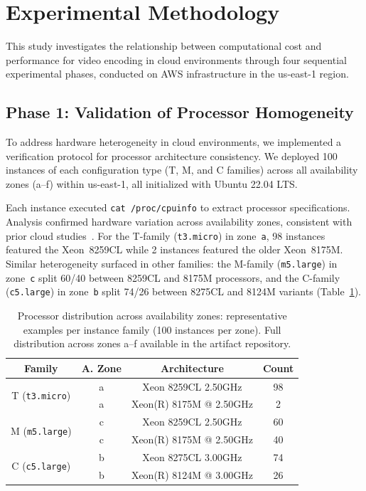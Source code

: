 \documentclass[conference]{IEEEtran}
\begin{document}
\section{Experimental Methodology}
\label{met}

This study investigates the relationship between computational cost and
performance for video encoding in cloud environments through four sequential
experimental phases, conducted on AWS infrastructure in the us-east-1 region.

\subsection{Phase 1: Validation of Processor Homogeneity}

To address hardware heterogeneity in cloud environments, we implemented a
verification protocol for processor architecture consistency. We deployed 100
instances of each configuration type (T, M, and C families) across all
availability zones (a--f) within us-east-1, all initialized with Ubuntu 22.04
LTS.

Each instance executed \texttt{cat /proc/cpuinfo} to extract processor
specifications. Analysis confirmed hardware variation across availability
zones, consistent with prior cloud studies~\cite{b2, b5, b6, b7}. For the
T-family (\texttt{t3.micro}) in zone~\texttt{a}, 98 instances featured the
Xeon~8259CL while 2 instances featured the older Xeon~8175M. Similar
heterogeneity surfaced in other families: the M-family (\texttt{m5.large}) in
zone~\texttt{c} split 60/40 between 8259CL and 8175M processors, and the
C-family (\texttt{c5.large}) in zone~\texttt{b} split 74/26 between 8275CL
and 8124M variants (Table~\ref{tab:processors}).

\begin{table}[H]
	\centering
	\caption{Processor distribution across availability zones: representative
	examples per instance family (100 instances per zone). Full distribution
	across zones a--f available in the artifact repository.}
	\small
	\label{tab:processors}
	\begin{tabular}{|c|c|c|c|}
		\hline
		\textbf{Family} & \textbf{A. Zone} & \textbf{Architecture} & \textbf{Count} \\ \hline
		\multirow{2}{*}{T (\texttt{t3.micro})} & a & Xeon 8259CL 2.50GHz & 98 \\ \cline{2-4}
		& a & Xeon(R) 8175M @ 2.50GHz & 2 \\ \hline
		\multirow{2}{*}{M (\texttt{m5.large})} & c & Xeon 8259CL 2.50GHz & 60 \\ \cline{2-4}
		& c & Xeon(R) 8175M @ 2.50GHz & 40 \\ \hline
		\multirow{2}{*}{C (\texttt{c5.large})} & b & Xeon  8275CL 3.00GHz & 74 \\ \cline{2-4}
		& b & Xeon(R) 8124M @ 3.00GHz & 26 \\ \hline
	\end{tabular}
\end{table}
\end{document}

